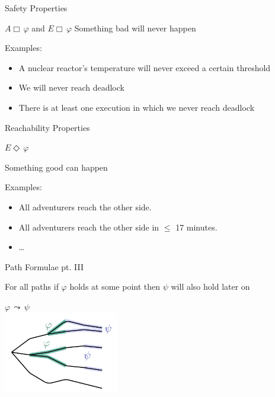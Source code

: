 \documentclass{beamer}
\begin{document}
\begin{slide}{Safety Properties}

\begin{block}{$A \Box\, \varphi$ and $E \Box\, \varphi$}
	Something bad will \alert{never} happen 

Examples:
\begin{itemize}
\item A nuclear reactor's temperature will never exceed a certain threshold
\item We will never reach deadlock
\item There is at least one execution in which we never reach deadlock
\end{itemize}

\end{block}

\end{slide}

\begin{slide}{Reachability Properties}

\begin{block}{$E \Diamond\, \varphi$}

        Something good \alert{can} happen

	Examples:
	\begin{itemize}
                \item All adventurers reach the other side.
                \item All adventurers reach the other side in $\leq$ 17 minutes.
                \item \dots
	\end{itemize}
\end{block}

\end{slide}


\begin{slide}{Path Formulae pt. III}

        For all paths if $\varphi$ holds at some point then $\psi$ will
also hold later on

\small \centering

\begin{center}
        \Large $\varphi\, \leadsto\, \psi$ \\[2mm]
 \includegraphics[width=5cm]{./images/LeadsTo.jpg} 
 \end{center}

\end{slide}
\end{document}
